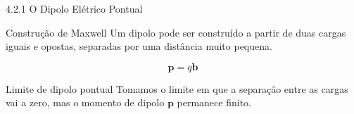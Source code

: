 \documentclass[aspectratio=169]{beamer}
\begin{document}


\begin{frame}{4.2.1 O Dipolo Elétrico Pontual}

\begin{mybox}{Construção de Maxwell}
Um dipolo pode ser construído a partir de duas cargas iguais e opostas,
separadas por uma distância muito pequena.
\end{mybox}

\begin{eqbox}
\begin{equation}
\mathbf p = q\mathbf b
\tag{4.13a}
\end{equation}
\end{eqbox}

\begin{mybox}{Limite de dipolo pontual}
Tomamos o limite em que a separação entre as cargas vai a zero, mas o momento
de dipolo \(\mathbf p\) permanece finito.
\end{mybox}

\end{frame}
\end{document}
